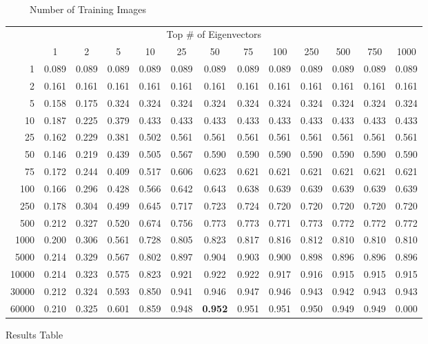 \documentclass[11pt]{report}
\begin{document}
\begin{figure}[H]
  \begin{sideways}\ \ \ \ \ Number of Training Images\end{sideways}
  \begin{small}
    \begin{tabular}[b]{@{}r c c c c c c c c c c c c@{}}
      \toprule
      \multicolumn{13}{c}{Top \# of Eigenvectors} \\
      ~ & 1 & 2 & 5 & 10 & 25 & 50 & 75 & 100 & 250 & 500 & 750 & 1000 \\
      \midrule
            1 & 0.089 & 0.089 & 0.089 & 0.089 & 0.089 & 0.089 & 0.089 & 0.089 & 0.089 & 0.089 & 0.089 & 0.089 \\
            2 & 0.161 & 0.161 & 0.161 & 0.161 & 0.161 & 0.161 & 0.161 & 0.161 & 0.161 & 0.161 & 0.161 & 0.161 \\
            5 & 0.158 & 0.175 & 0.324 & 0.324 & 0.324 & 0.324 & 0.324 & 0.324 & 0.324 & 0.324 & 0.324 & 0.324 \\
           10 & 0.187 & 0.225 & 0.379 & 0.433 & 0.433 & 0.433 & 0.433 & 0.433 & 0.433 & 0.433 & 0.433 & 0.433 \\
           25 & 0.162 & 0.229 & 0.381 & 0.502 & 0.561 & 0.561 & 0.561 & 0.561 & 0.561 & 0.561 & 0.561 & 0.561 \\
           50 & 0.146 & 0.219 & 0.439 & 0.505 & 0.567 & 0.590 & 0.590 & 0.590 & 0.590 & 0.590 & 0.590 & 0.590 \\
           75 & 0.172 & 0.244 & 0.409 & 0.517 & 0.606 & 0.623 & 0.621 & 0.621 & 0.621 & 0.621 & 0.621 & 0.621 \\
          100 & 0.166 & 0.296 & 0.428 & 0.566 & 0.642 & 0.643 & 0.638 & 0.639 & 0.639 & 0.639 & 0.639 & 0.639 \\
          250 & 0.178 & 0.304 & 0.499 & 0.645 & 0.717 & 0.723 & 0.724 & 0.720 & 0.720 & 0.720 & 0.720 & 0.720 \\
          500 & 0.212 & 0.327 & 0.520 & 0.674 & 0.756 & 0.773 & 0.773 & 0.771 & 0.773 & 0.772 & 0.772 & 0.772 \\
         1000 & 0.200 & 0.306 & 0.561 & 0.728 & 0.805 & 0.823 & 0.817 & 0.816 & 0.812 & 0.810 & 0.810 & 0.810 \\
         5000 & 0.214 & 0.329 & 0.567 & 0.802 & 0.897 & 0.904 & 0.903 & 0.900 & 0.898 & 0.896 & 0.896 & 0.896 \\
        10000 & 0.214 & 0.323 & 0.575 & 0.823 & 0.921 & 0.922 & 0.922 & 0.917 & 0.916 & 0.915 & 0.915 & 0.915 \\
        30000 & 0.212 & 0.324 & 0.593 & 0.850 & 0.941 & 0.946 & 0.947 & 0.946 & 0.943 & 0.942 & 0.943 & 0.943 \\
        60000 & 0.210 & 0.325 & 0.601 & 0.859 & 0.948 & \textbf{0.952} & 0.951 & 0.951 & 0.950 & 0.949 & 0.949 & 0.000 \\
      \bottomrule
    \end{tabular}
  \end{small}
  \caption{Results Table}
  \label{fig:tabled}
\end{figure}
\end{document}
